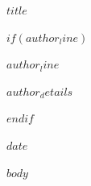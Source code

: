 \documentclass[$fontsize$,$papersize$paper]{article}
\begin{document}
\thispagestyle{plain}
{\fontsize{19}{22}\selectfont\bfseries\raggedright $title$\par}
\vspace{7pt}
$if(author_line)$
{\fontsize{11.5}{14}\selectfont $author_line$\par}
\vspace{4pt}
{\fontsize{9.5}{11.8}\selectfont{}\setlength{\parskip}{3pt}
\raggedright{}
$author_details$
\par}
\vspace{5pt}
$endif$
{\small $date$\par}
\vspace{11pt}
$body$
\end{document}
